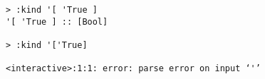 \begin{repl}\begin{lstlisting}
> :kind '[ 'True ]
'[ 'True ] :: [Bool]

> :kind '['True]

<interactive>:1:1: error: parse error on input ‘'’\end{lstlisting}\end{repl}
